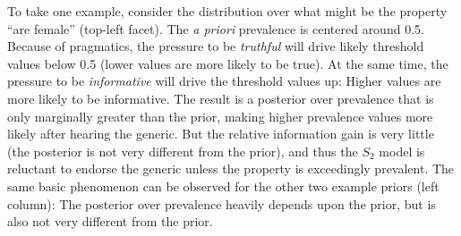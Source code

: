 \documentclass[12pt,letterpaper]{article}
\begin{document}
To take one example, consider the distribution over what might be the property ``are female'' (top-left facet).
The \emph{a priori} prevalence is centered around 0.5.
Because of pragmatics, the pressure to be \emph{truthful} will drive likely threshold values below 0.5 (lower values are more likely to be true). 
At the same time, the pressure to be \emph{informative} will drive the threshold values up: Higher values are more likely to be informative. 
The result is a posterior over prevalence that is only marginally greater than the prior, making higher prevalence values more likely after hearing the generic. 
But the relative information gain is very little (the posterior is not very different from the prior), and thus the $S_2$ model is reluctant to endorse the generic unless the property is exceedingly prevalent. 
The same basic phenomenon can be observed for the other two example priors (left column): The posterior over prevalence heavily depends upon the prior, but is also not very different from the prior. %

%
\end{document}
